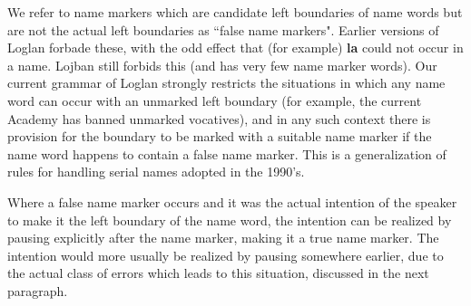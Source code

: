 \documentclass[12pt]{book}
\begin{document}
We refer to name markers which are candidate left boundaries of name words but are not the actual left boundaries as ``false name markers".  Earlier versions of Loglan forbade these, with the odd effect that (for example) {\bf la} could not occur in a name.  Lojban still forbids this (and has very few name marker words).  Our current grammar of Loglan strongly restricts the situations in which any name word can occur with an unmarked left boundary (for example, the current Academy has banned unmarked vocatives), and in any such context there is provision for the boundary to be marked with a suitable name marker if the name word happens to contain a false name marker.  This is a generalization of rules for handling serial names adopted in the 1990's.

Where a false name marker occurs and it was the actual intention of the speaker to make it the left boundary of the name word, the intention can be realized by pausing explicitly after the name marker, making it a true name marker.  The intention would more usually be realized by pausing somewhere earlier, due to the actual class of errors which leads to this situation, discussed in the next paragraph.
\end{document}
